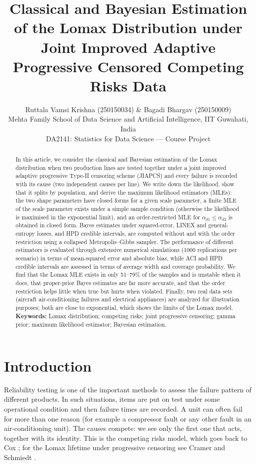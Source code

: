 \documentclass[a4paper,11pt]{article}
\title{Classical and Bayesian Estimation of the Lomax Distribution under Joint Improved Adaptive Progressive Censored Competing Risks Data}
\author{Ruttala Vamsi Krishna (250150034) \& Bagadi Bhargav (250150009) \\ Mehta Family School of Data Science and Artificial Intelligence, IIT Guwahati, India \\ DA2141: Statistics for Data Science --- Course Project}
\date{}
\begin{document}
\begin{singlespace}
 \maketitle
\end{singlespace}

\begin{abstract}
\noindent In this article, we consider the classical and Bayesian estimation of the Lomax distribution when two production lines are tested together under a joint improved adaptive progressive Type-II censoring scheme (JIAPCS) and every failure is recorded with its cause (two independent causes per line). We write down the likelihood, show that it splits by population, and derive the maximum likelihood estimators (MLEs): the two shape parameters have closed forms for a given scale parameter, a finite MLE of the scale parameter exists under a simple sample condition (otherwise the likelihood is maximised in the exponential limit), and an order-restricted MLE for $\alpha_{d1}\le\alpha_{d2}$ is obtained in closed form. Bayes estimates under squared-error, LINEX and general-entropy losses, and HPD credible intervals, are computed without and with the order restriction using a collapsed Metropolis--Gibbs sampler. The performance of different estimators is evaluated through extensive numerical simulations (1000 replications per scenario) in terms of mean-squared error and absolute bias, while ACI and HPD credible intervals are assessed in terms of average width and coverage probability. We find that the Lomax MLE exists in only 51--79\% of the samples and is unstable when it does, that proper-prior Bayes estimates are far more accurate, and that the order restriction helps little when true but hurts when violated. Finally, two real data sets (aircraft air-conditioning failures and electrical appliances) are analyzed for illustration purposes; both are close to exponential, which shows the limits of the Lomax model.\\
\textbf{Keywords:} Lomax distribution; competing risks; joint progressive censoring; gamma prior; maximum likelihood estimator; Bayesian estimation.\\
\end{abstract}

\section{Introduction}
\label{sec:introduction}
Reliability testing is one of the important methods to assess the failure pattern of different products. In such situations, items are put on test under some operational condition and then failure times are recorded. A unit can often fail for more than one reason (for example a compressor fault or any other fault in an air-conditioning unit). The causes compete: we see only the first one that acts, together with its identity. This is the competing risks model, which goes back to Cox \cite{cox1959}; for the Lomax lifetime under progressive censoring see Cramer and Schmiedt \cite{cramer2011}.
\end{document}
